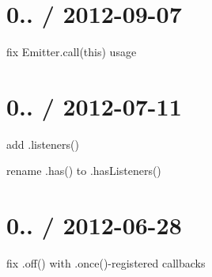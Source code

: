 \section*{0.. / 2012-\/09-\/07 }


\begin{DoxyItemize}
\item fix {\ttfamily Emitter.\+call(this)} usage
\end{DoxyItemize}

\section*{0.. / 2012-\/07-\/11 }


\begin{DoxyItemize}
\item add {\ttfamily .listeners()}
\item rename {\ttfamily .has()} to {\ttfamily .has\+Listeners()}
\end{DoxyItemize}

\section*{0.. / 2012-\/06-\/28 }


\begin{DoxyItemize}
\item fix {\ttfamily .off()} with {\ttfamily .once()}-\/registered callbacks 
\end{DoxyItemize}